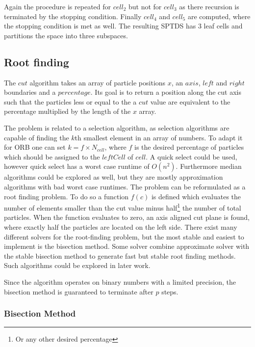 \documentclass[]{article}
\begin{document}
Again the procedure is repeated for $cell_2$ but not for $cell_3$ as there recursion is terminated by the stopping condition. Finally $cell_4$ and $cell_5$ are computed, where the stopping condition is met as well. The resulting SPTDS has 3 leaf cells and partitions the space into three subspaces.


\subsection{Root finding} \label{sec:root}


The $cut$ algorithm takes an array of particle positions $x$, an $axis$, $left$ and $right$ boundaries and a $percentage$. Its goal is to return a position along the cut axis such that the particles less or equal to the a $cut$ value are equivalent to the percentage multiplied by the length of the $x$ array.

The problem is related to a selection algorithm, as selection algorithms are capable of finding the $k$th smallest element in an array of numbers. To adapt it for ORB one can set $k = f \times N_{cell}$, where $f$ is the desired percentage of particles which should be assigned to the $leftCell$ of $cell$. A quick select \cite{algorithms} could be used, however quick select has a worst case runtime of $O(n^2)$. Furthermore median algorithms could be explored as well, but they are mostly approximation algorithms with bad worst case runtimes. The problem can be reformulated as a root finding problem. To do so a function $f(c)$ is defined which evaluates the number of elements smaller than the cut value minus half\footnote{Or any other desired percentage} the number of total particles. When the function evaluates to zero, an axis aligned cut plane is found, where exactly half the particles are located on the left side. There exist many different solvers for the root-finding problem, but the most stable and easiest to implement is the bisection method. Some solver combine approximate solver with the stable bisection method to generate fast but stable root finding methods. Such algorithms could be explored in later work.

Since the algorithm operates on binary numbers with a limited precision, the bisection method is guaranteed to terminate after $p$ steps.

\subsubsection{Bisection Method}
\end{document}
